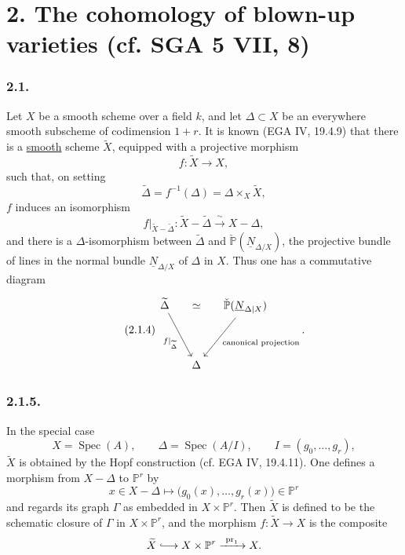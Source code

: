 \section*{2. The cohomology of blown-up varieties (cf. SGA 5 VII, 8)}

\subsubsection*{2.1.}
Let $X$ be a smooth scheme over a field $k$, and let
$\Delta\subset X$ be an everywhere smooth subscheme of codimension $1+r$.
It is known (EGA IV, 19.4.9) that there is a \underline{smooth} scheme
$\widetilde X$, equipped with a projective morphism
\begin{equation}\tag{2.1.1}
f:\widetilde X\longrightarrow X,
\end{equation}
such that, on setting
\begin{equation}\tag{2.1.2}
\widetilde\Delta=f^{-1}(\Delta)
=\Delta\times_X\widetilde X,
\end{equation}
$f$ induces an isomorphism
\begin{equation}\tag{2.1.3}
f|_{\widetilde X-\widetilde\Delta}:
\widetilde X-\widetilde\Delta
\xrightarrow{\ \sim\ }X-\Delta,
\end{equation}
and there is a $\Delta$-isomorphism between $\widetilde\Delta$ and
$\check{\mathbb P}(\underline N_{\Delta/X})$, the projective bundle of
lines in the normal bundle $\underline N_{\Delta/X}$ of $\Delta$ in $X$.
Thus one has a commutative diagram
\begin{equation}\tag{2.1.4}
\begin{tikzcd}[row sep=huge,column sep=small]
\widetilde\Delta
  \arrow[rd,"f|_{\widetilde\Delta}"']
  & \simeq &
\check{\mathbb P}(\underline N_{\Delta|X})
  \arrow[ld,"\text{canonical projection}"]\\
{} & \Delta & {}
\end{tikzcd}.
\end{equation}

\subsubsection*{2.1.5.}
In the special case
\[
X=\operatorname{Spec}(A),\qquad
\Delta=\operatorname{Spec}(A/I),\qquad
I=(g_0,\ldots,g_r),
\]
$\widetilde X$ is obtained by the Hopf construction (cf. EGA IV, 19.4.11).
One defines a morphism from $X-\Delta$ to $\mathbb P^r$ by
\[
x\in X-\Delta\longmapsto
\bigl(g_0(x),\ldots,g_r(x)\bigr)\in\mathbb P^r
\]
and regards its graph $\Gamma$ as embedded in $X\times\mathbb P^r$. Then
$\widetilde X$ is defined to be the schematic closure of $\Gamma$ in
$X\times\mathbb P^r$, and the morphism
$f:\widetilde X\longrightarrow X$ is the composite
\[
\widetilde X\lhook\joinrel\longrightarrow
X\times\mathbb P^r\xrightarrow{\ \operatorname{pr}_1\ }X.
\]


